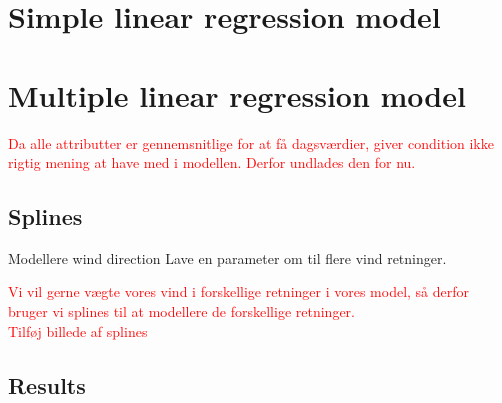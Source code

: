 \section{Simple linear regression model}

\section{Multiple linear regression model}
\textcolor{red}{Da alle attributter er gennemsnitlige for at få dagsværdier, giver condition ikke rigtig mening at have med i modellen. Derfor undlades den for nu.}

\subsection{Splines}

Modellere wind direction
Lave en parameter om til flere vind retninger.


\textcolor{red}{Vi vil gerne vægte vores vind i forskellige retninger i vores model, så derfor bruger vi splines til at modellere de forskellige retninger.} \\

\textcolor{red}{Tilføj billede af splines}

\subsection{Results}